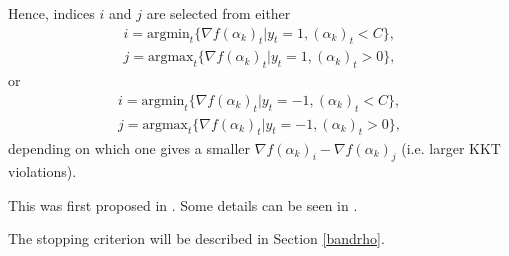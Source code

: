 \documentclass[11pt]{article}
\theoremstyle{break}
\begin{document}
Hence, indices
$i$ and $j$ are selected from 
either
\begin{equation}
\label{selyp}
\begin{array}{l}
 i = \mbox{argmin}_t \{ \nabla f(\alpha_k)_t |
y_t = 1, (\alpha_k)_t < C \},  \\
 j = \mbox{argmax}_t \{ \nabla f(\alpha_k)_t | 
y_t = 1, (\alpha_k)_t > 0\}, 
\end{array}
\end{equation}
or
\begin{equation}
\label{selyn}
\begin{array}{l}
i = \mbox{argmin}_t \{ \nabla f(\alpha_k)_t | 
y_t = -1, (\alpha_k)_t < C \},  \\
j = \mbox{argmax}_t \{ \nabla f(\alpha_k)_t | 
y_t = -1, (\alpha_k)_t > 0\}, 
\end{array}
\end{equation}
depending on which one gives a smaller
$\nabla f(\alpha_k)_i - \nabla f(\alpha_k)_j$
(i.e. larger KKT violations).

This was first proposed in 
. 
Some details can be seen in 
.

The stopping criterion 
will be described in 
Section \ref{bandrho}.
\end{document}
